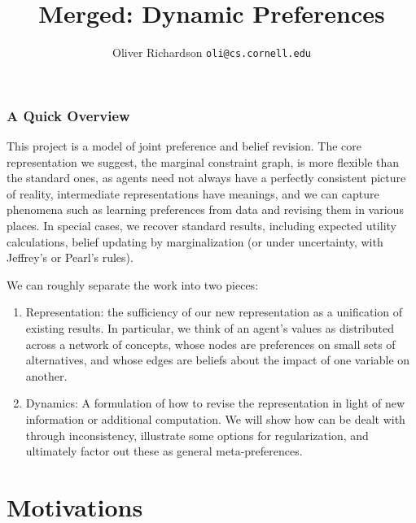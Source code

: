 \documentclass{article}
\title{Merged: Dynamic Preferences}
\author{Oliver Richardson  \texttt{oli@cs.cornell.edu}}
\begin{document}
	\maketitle
	

	\section*{A Quick Overview}
	This project is a model of joint preference and belief revision. The core representation we suggest, the marginal constraint graph, is more flexible than the standard ones, as agents need not always have a perfectly consistent picture of reality, intermediate representations have meanings, and we can capture phenomena such as learning preferences from data and revising them in various places. In special cases, we recover standard results, including expected utility calculations, belief updating by marginalization (or under uncertainty, with Jeffrey's or Pearl's rules).
	
	We can roughly separate the work into two pieces:
	\begin{enumerate}%
		\item Representation: the sufficiency of our new representation as a unification of existing results. In particular, we think of an agent's values as distributed across a network of concepts, whose nodes are preferences on small sets of alternatives, and whose edges are beliefs about the impact of one variable on another.
		\item Dynamics: A formulation of how to revise the representation in light of new information or additional computation. We will show how can be dealt with through inconsistency, illustrate some options for regularization, and ultimately factor out these as general meta-preferences. 
	\end{enumerate}
	
	\part{Motivations}
\end{document}
